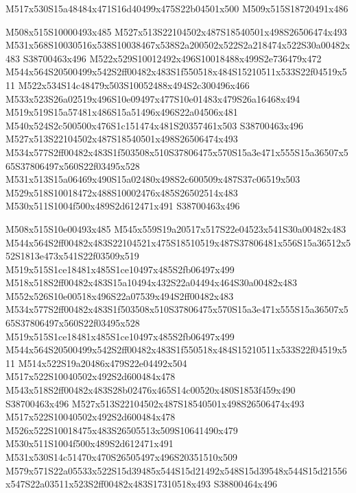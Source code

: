 \documentclass{article}
\begin{document}
\begin{multicols}{2}
\begin{center}
M517x530S15a48484x471S16d40499x475S22b04501x500 M509x515S18720491x486 
\end{center}


M508x515S10000493x485 M527x513S22104502x487S18540501x498S26506474x493 M531x568S10030516x538S10038467x538S2a200502x522S2a218474x522S30a00482x483 S38700463x496 M522x529S10012492x496S10018488x499S2e736479x472 M544x564S20500499x542S2ff00482x483S1f550518x484S15210511x533S22f04519x511 M522x534S14c48479x503S10052488x494S2c300496x466 M533x523S26a02519x496S10e09497x477S10e01483x479S26a16468x494 M519x519S15a57481x486S15a51496x496S22a04506x481 M540x524S2c500500x476S1c151474x481S20357461x503 S38700463x496 M527x513S22104502x487S18540501x498S26506474x493 M534x577S2ff00482x483S1f503508x510S37806475x570S15a3e471x555S15a36507x565S37806497x560S22f03495x528 M531x513S15a06469x490S15a02480x498S2c600509x487S37c06519x503 M529x518S10018472x488S10002476x485S26502514x483 M530x511S1004f500x489S2d612471x491 S38700463x496

M508x515S10e00493x485 M545x559S19a20517x517S22e04523x541S30a00482x483 M544x564S2ff00482x483S22104521x475S18510519x487S37806481x556S15a36512x552S1813e473x541S22f03509x519 M519x515S1ce18481x485S1ce10497x485S2fb06497x499 M518x518S2ff00482x483S15a10494x432S22a04494x464S30a00482x483 M552x526S10e00518x496S22a07539x494S2ff00482x483 M534x577S2ff00482x483S1f503508x510S37806475x570S15a3e471x555S15a36507x565S37806497x560S22f03495x528 M519x515S1ce18481x485S1ce10497x485S2fb06497x499 M544x564S20500499x542S2ff00482x483S1f550518x484S15210511x533S22f04519x511 M514x522S19a20486x479S22e04492x504 M517x522S10040502x492S2d600484x478 M543x518S2ff00482x483S28b02476x465S14c00520x480S1853f459x490 S38700463x496 M527x513S22104502x487S18540501x498S26506474x493 M517x522S10040502x492S2d600484x478 M526x522S10018475x483S26505513x509S10641490x479 M530x511S1004f500x489S2d612471x491 M531x530S14c51470x470S26505497x496S20351510x509 M579x571S22a05533x522S15d39485x544S15d21492x548S15d39548x544S15d21556x547S22a03511x523S2ff00482x483S17310518x493 S38800464x496


\end{multicols}
\end{document}
